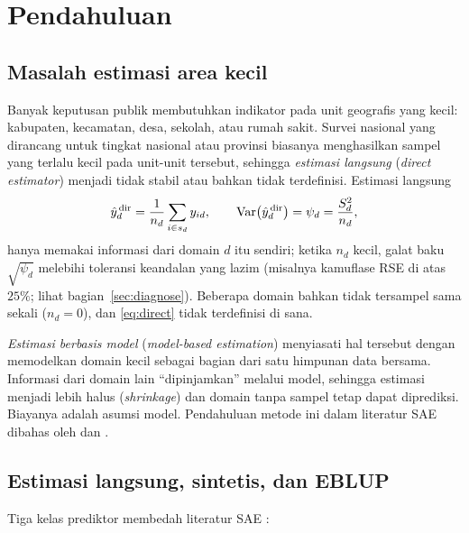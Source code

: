 \section{Pendahuluan}\label{sec:intro}

\subsection{Masalah estimasi area kecil}

Banyak keputusan publik membutuhkan indikator pada unit geografis yang kecil:
kabupaten, kecamatan, desa, sekolah, atau rumah sakit. Survei nasional yang
dirancang untuk tingkat nasional atau provinsi biasanya menghasilkan sampel yang
terlalu kecil pada unit-unit tersebut, sehingga \emph{estimasi langsung}
(\emph{direct estimator}) menjadi tidak stabil atau bahkan tidak terdefinisi.
Estimasi langsung
\begin{equation}
  \hat y_d^{\,\mathrm{dir}}=\frac{1}{n_d}\sum_{i\in s_d} y_{id},
  \qquad
  \operatorname{Var}\!\left(\hat y_d^{\,\mathrm{dir}}\right)=\psi_d=\frac{S_d^2}{n_d},
  \label{eq:direct}
\end{equation}
hanya memakai informasi dari domain $d$ itu sendiri; ketika $n_d$ kecil, galat
baku $\sqrt{\psi_d}$ melebihi toleransi keandalan yang lazim (misalnya
kamuflase RSE di atas $25\%$; lihat bagian~\ref{sec:diagnose}). Beberapa domain
bahkan tidak tersampel sama sekali ($n_d=0$), dan \eqref{eq:direct} tidak
terdefinisi di sana.

\emph{Estimasi berbasis model} (\emph{model-based estimation}) menyiasati hal
tersebut dengan memodelkan domain kecil sebagai bagian dari satu himpunan data
bersama. Informasi dari domain lain ``dipinjamkan'' melalui model, sehingga
estimasi menjadi lebih halus (\emph{shrinkage}) dan domain tanpa sampel tetap
dapat diprediksi. Biayanya adalah asumsi model. Pendahuluan metode ini dalam
literatur SAE dibahas oleh \citet{pfeffermann2013new} dan
\citet{rao2015small}.

\subsection{Estimasi langsung, sintetis, dan EBLUP}

Tiga kelas prediktor membedah literatur SAE \citep{rao2015small}:

